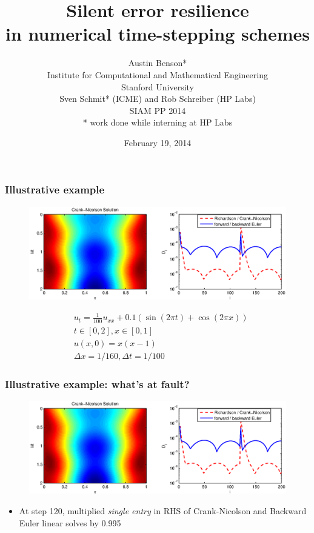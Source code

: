\documentclass{beamer}
\title{Silent error resilience \\
in numerical time-stepping schemes}
\author{
Austin Benson* \\
Institute for Computational and Mathematical Engineering \\
Stanford University \\
\vspace{0.1in}
Sven Schmit* (ICME) and Rob Schreiber (HP Labs) \\
\vspace{0.2in}
SIAM PP 2014 \\
\vspace{0.2in}
* work done while interning at HP Labs
}
\date{February 19, 2014}
\begin{document}
\maketitle

%
\begin{frame}
\frametitle{Illustrative example}

\begin{figure}
  \centering
  \includegraphics[scale=0.5]{figs/heat_soln_diffs1.eps}
  \vspace{-1cm}
\end{figure}

\begin{align}
& u_t = \frac{1}{100}u_{xx} + 0.1\left(\sin(2\pi t) + \cos(2\pi x)\right) \nonumber \\
& t \in [0, 2], x \in [0, 1] \nonumber \\
& u(x, 0) = x(x-1) \nonumber \\
& \Delta x = 1 / 160, \Delta t = 1 / 100 \nonumber 
\end{align}

\end{frame}

\begin{frame}
\frametitle{Illustrative example: what's at fault?}

\begin{figure}
  \centering
  \includegraphics[scale=0.5]{figs/heat_soln_diffs1.eps}
\end{figure}

\begin{itemize}
\item At step 120, multiplied \emph{single entry} in RHS of Crank-Nicolson and Backward Euler linear solves by 0.995
\end{itemize}

\end{frame}
\end{document}
